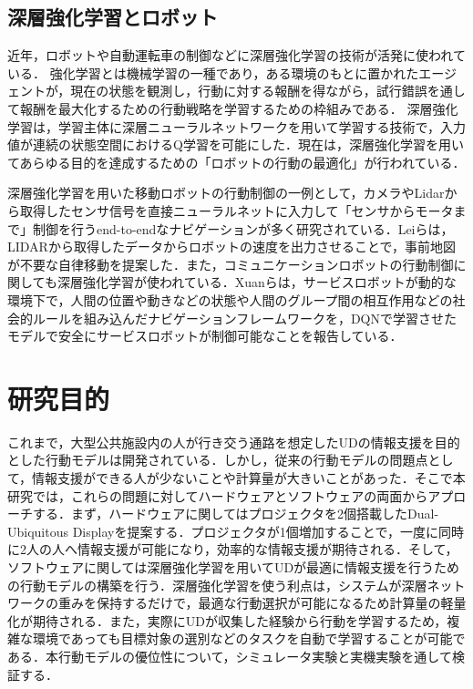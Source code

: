 \documentclass[12pt]{sonota/aislab}
\begin{document}
\subsection{深層強化学習とロボット}
近年，ロボットや自動運転車の制御などに深層強化学習の技術が活発に使われている．
強化学習とは機械学習の一種であり，ある環境のもとに置かれたエージェントが，現在の状態を観測し，行動に対する報酬を得ながら，試行錯誤を通して報酬を最大化するための行動戦略を学習するための枠組みである\cite{RL}．
深層強化学習は，学習主体に深層ニューラルネットワークを用いて学習する技術で，入力値が連続の状態空間におけるQ学習を可能にした\cite{drl}．現在は，深層強化学習を用いてあらゆる目的を達成するための「ロボットの行動の最適化」が行われている\cite{Human_level_dqn}\cite{sarl}．

深層強化学習を用いた移動ロボットの行動制御の一例として，カメラやLidarから取得したセンサ信号を直接ニューラルネットに入力して「センサからモータまで」制御を行うend-to-endなナビゲーションが多く研究されている\cite{ete}\cite{Self}\cite{vtr}．Leiらは，LIDARから取得したデータからロボットの速度を出力させることで，事前地図が不要な自律移動を提案した\cite{vtr}．また，コミュニケーションロボットの行動制御に関しても深層強化学習が使われている．Xuanらは，サービスロボットが動的な環境下で，人間の位置や動きなどの状態や人間のグループ間の相互作用などの社会的ルールを組み込んだナビゲーションフレームワーク\cite{human_navigation}を，DQNで学習させたモデルで安全にサービスロボットが制御可能なことを報告している\cite{human_navigation_dqn}．

\section{研究目的}
これまで，大型公共施設内の人が行き交う通路を想定したUDの情報支援を目的とした行動モデルは開発されている．しかし，従来の行動モデルの問題点として，情報支援ができる人が少ないことや計算量が大きいことがあった．そこで本研究では，これらの問題に対してハードウェアとソフトウェアの両面からアプローチする．まず，ハードウェアに関してはプロジェクタを2個搭載したDual-Ubiquitous Displayを提案する．プロジェクタが1個増加することで，一度に同時に2人の人へ情報支援が可能になり，効率的な情報支援が期待される．そして，ソフトウェアに関しては深層強化学習を用いてUDが最適に情報支援を行うための行動モデルの構築を行う．深層強化学習を使う利点は，システムが深層ネットワークの重みを保持するだけで，最適な行動選択が可能になるため計算量の軽量化が期待される．また，実際にUDが収集した経験から行動を学習するため，複雑な環境であっても目標対象の選別などのタスクを自動で学習することが可能である．本行動モデルの優位性について，シミュレータ実験と実機実験を通して検証する．
\end{document}

